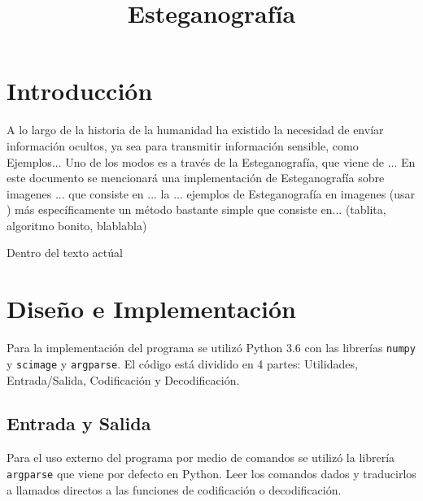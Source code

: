\documentclass[conference]{IEEEtran}
\begin{document}
\title{Esteganografía}
\author{
}


\maketitle

\begin{abstract}

\end{abstract}

\section*{Introducción} %
    A lo largo de la historia de la humanidad ha existido la necesidad de envíar información ocultos, ya sea para transmitir información sensible, como  Ejemplos...
    Uno de los modos es a través de la Esteganografía, que viene de ...
    En este documento se mencionará una implementación de Esteganografía sobre imagenes ... que consiste en ... la
    ... ejemplos de Esteganografía en imagenes (usar \cite{DIS})
    más específicamente un método bastante simple que consiste en...
    (tablita, algoritmo bonito, blablabla)

    Dentro del texto actúal     
    
\section*{Diseño e Implementación}
	Para la implementación del programa se utilizó Python 3.6 con las librerías \texttt{numpy} y     
	\texttt{scimage} y \texttt{argparse}. El código está dividido en 4 partes: Utilidades, Entrada/Salida, Codificación y Decodificación.
\subsection*{Entrada y Salida}
    Para el uso externo del programa por medio de comandos se utilizó la librería \texttt{argparse} que viene por defecto en Python. Leer los comandos dados y traducirlos a llamados directos a las funciones de codificación o decodificación.
    	
\end{document}
